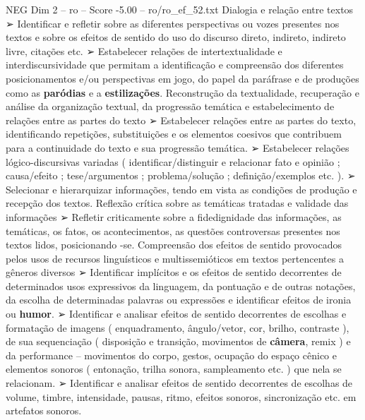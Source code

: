 \begin{textsample}{NEG Dim 2 – ro – Score -5.00 – ro/ro\_ef\_52.txt}
Dialogia e relação entre textos {\EmojiFont ➢} Identificar e refletir sobre as diferentes perspectivas ou vozes presentes nos textos e sobre os efeitos de sentido do uso do discurso direto, indireto, indireto livre, citações etc. {\EmojiFont ➢} Estabelecer relações de intertextualidade e interdiscursividade que permitam a identificação e compreensão dos diferentes posicionamentos e/ou perspectivas em jogo, do papel da paráfrase e de produções como as \textbf{paródias} e a \textbf{estilizações}.
Reconstrução da textualidade, recuperação e análise da organização textual, da progressão temática e estabelecimento de relações entre as partes do texto {\EmojiFont ➢} Estabelecer relações entre as partes do texto, identificando repetições, substituições e os elementos coesivos que contribuem para a continuidade do texto e sua progressão temática. {\EmojiFont ➢} Estabelecer relações lógico-discursivas variadas ( identificar/distinguir e relacionar fato e opinião ; causa/efeito ; tese/argumentos ; problema/solução ; definição/exemplos etc. ). {\EmojiFont ➢} Selecionar e hierarquizar informações, tendo em vista as condições de produção e recepção dos textos.
Reflexão crítica sobre as temáticas tratadas e validade das informações {\EmojiFont ➢} Refletir criticamente sobre a fidedignidade das informações, as temáticas, os fatos, os acontecimentos, as questões controversas presentes nos textos lidos, posicionando -se.
Compreensão dos efeitos de sentido provocados pelos usos de recursos linguísticos e multissemióticos em textos pertencentes a gêneros diversos {\EmojiFont ➢} Identificar implícitos e os efeitos de sentido decorrentes de determinados usos expressivos da linguagem, da pontuação e de outras notações, da escolha de determinadas palavras ou expressões e identificar efeitos de ironia ou \textbf{humor}. {\EmojiFont ➢} Identificar e analisar efeitos de sentido decorrentes de escolhas e formatação de imagens ( enquadramento, ângulo/vetor, cor, brilho, contraste ), de sua sequenciação ( disposição e transição, movimentos de \textbf{câmera}, remix ) e da performance – movimentos do corpo, gestos, ocupação do espaço cênico e elementos sonoros ( entonação, trilha sonora, sampleamento etc. ) que nela se relacionam. {\EmojiFont ➢} Identificar e analisar efeitos de sentido decorrentes de escolhas de volume, timbre, intensidade, pausas, ritmo, efeitos sonoros, sincronização etc. em artefatos sonoros.

\end{textsample}
